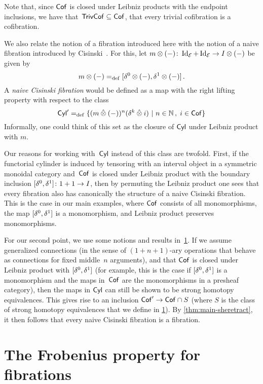 \documentclass[reqno,10pt,a4paper,oneside,draft]{amsart}
\begin{document}
Note that, since $\mathsf{Cof}$ is  closed under Leibniz products with the endpoint inclusions, we have that~$\mathsf{TrivCof} \subseteq \mathsf{Cof}$, \ie
that every trivial cofibration is a cofibration. 
\begin{remark} \label{cisinski-remark}
We also relate the notion of a fibration introduced here with the notion of a naive fibration introduced by Cisinski~\cite{cisinski-asterisque}.
For this, let $m \otimes (-)  \colon \operatorname{Id}_{\mathcal{E}} + \operatorname{Id}_{\mathcal{E}} \to I \otimes (-)$ be given by
\[
  m \otimes (-) =_{\operatorname{def}} [\delta^0 \otimes (-), \delta^1 \otimes (-)] \, .
\]
A \emph{naive Cisinski fibration} would be defined as a map with the right lifting property with respect to the class
\[
\mathsf{Cyl}' =_{\operatorname{def}} \{ (m \mathbin{\hat{\otimes}} (-))^n ( \delta^k \mathbin{\hat{\otimes}} i ) \ | \ n \in \mathbb{N} \, , \;  i \in \mathsf{Cof} \} 
\]
Informally, one could think of this set as the closure of $\mathsf{Cyl}$ under Leibniz product with $m$. 

Our reasons for working with~$\mathsf{Cyl}$ instead of this class are twofold. First, if the functorial cylinder is induced by tensoring with an interval object in a symmetric monoidal category and~$\mathsf{Cof}$ is closed under Leibniz product with the boundary inclusion $[\delta^0, \delta^1] \colon 1 + 1 \to I$, then by permuting the Leibniz product one sees that every fibration also has canonically the structure of a  naive Cisinski fibration.
This is the case in our main examples, where $\mathsf{Cof}$ consists of all monomorphisms, the map $[\delta^0, \delta^1]$ is a monomorphism, and Leibniz product preserves monomorphisms. 

For our second point, we use some notions and results in~\cref{sec:frobprop}.
If we assume generalized connections (in the sense of $(1+n+1)$-ary operations that behave as connections for fixed middle~$n$ arguments), and that $\mathsf{Cof}$ is closed under Leibniz product with $[\delta^0, \delta^1]$ (for example, this is the case if $[\delta^0, \delta^1]$ is a monomorphism and the maps in~$\mathsf{Cof}$ are the monomorphisms in a presheaf category), then the maps in $\mathsf{Cyl}$ can still be shown to be strong homotopy equivalences. This gives rise to an inclusion $\mathsf{Cof}' \to \mathsf{Cof} \cap S$  (where $S$ is the class of strong homotopy equivalences that we define in \cref{sec:frobprop}). By \cref{thm:main-sheretract}, it then follows that every naive Cisinski fibration is a fibration.
\end{remark}


\section{The Frobenius property for fibrations}
\label{sec:frobprop}
\end{document}
